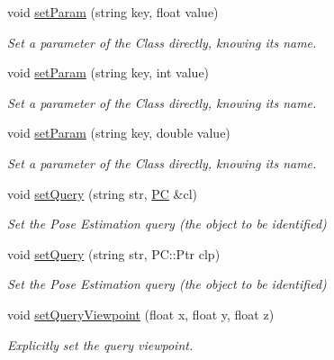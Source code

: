 \begin{DoxyCompactItemize}
void \hyperlink{classPoseEstimation_ae416bbbfdefdb60a6f82a9b255edc124}{set\-Param} (string key, float value)
\begin{DoxyCompactList}\small\item\em Set a parameter of the Class directly, knowing its name. \end{DoxyCompactList}\item 
void \hyperlink{classPoseEstimation_a1d768a589eb6424d936afb9f15d28067}{set\-Param} (string key, int value)
\begin{DoxyCompactList}\small\item\em Set a parameter of the Class directly, knowing its name. \end{DoxyCompactList}\item 
void \hyperlink{classPoseEstimation_ae1902de07546dd5a2b4ffbbd08fed7b2}{set\-Param} (string key, double value)
\begin{DoxyCompactList}\small\item\em Set a parameter of the Class directly, knowing its name. \end{DoxyCompactList}\item 
void \hyperlink{classPoseEstimation_a8c3e730167d42d2d8cfd4a08389d17ce}{set\-Query} (string str, \hyperlink{group__Definitions_ga62eb21fcfa3189c5de50fb62a2a7a79e}{P\-C} \&cl)
\begin{DoxyCompactList}\small\item\em Set the Pose Estimation query (the object to be identified) \end{DoxyCompactList}\item 
void \hyperlink{classPoseEstimation_a0abb4e19ca862ef280f8d76ed2f9bac7}{set\-Query} (string str, P\-C\-::\-Ptr clp)
\begin{DoxyCompactList}\small\item\em Set the Pose Estimation query (the object to be identified) \end{DoxyCompactList}\item 
void \hyperlink{classPoseEstimation_a378321aa07ca329332f20ba8bf6ffaad}{set\-Query\-Viewpoint} (float x, float y, float z)
\begin{DoxyCompactList}\small\item\em Explicitly set the query viewpoint. \end{DoxyCompactList}\end{DoxyCompactItemize}
